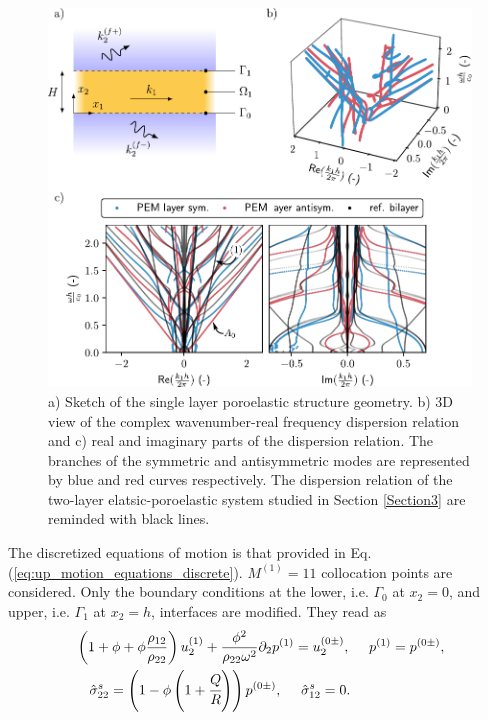 \begin{figure}
    \centering
    \includegraphics{chapitres/article_JAP/figures/poroelastic_appendix.pdf}
    \caption{a) Sketch of the single layer poroelastic structure geometry. b) 3D view of the complex wavenumber-real frequency dispersion relation and c) real and imaginary parts of the dispersion relation. The branches of the symmetric and antisymmetric modes are represented by blue and red curves respectively. The dispersion relation of the two-layer elatsic-poroelastic system studied in Section \ref{Section3} are reminded with black lines.}
    \label{fig:fluid_coupled_poroelastic}
\end{figure}
The discretized equations of motion is that provided in Eq.(\ref{eq:up_motion_equations_discrete}). $M^{(1)}=11$ collocation points are considered. Only the boundary conditions at the lower, i.e. $\Gamma_0$ at $x_2 = 0$, and upper, i.e. $\Gamma_1$ at $x_2 = h$, interfaces are modified. They read as \cite{debergue1999}
    \begin{equation}
        \begin{split}
            & \left(1 + \phi + \phi\frac{ \rho_{12}}{ \rho_{22}}\right)u_2^{(1)} + \frac{\phi^2}{ \rho_{22} \omega^2} \partial_2 p^{(1)} = u_2^{(0\pm)},~ 
            \quad p^{(1)}  = p^{(0\pm)},\\
            &\quad \hat \sigma_{22}^s = \left( 1 - \phi \left(1+ \cfrac{ Q} { R}\right)\right) p^{(0\pm)},~
            \quad \hat \sigma_{12}^s = 0.
        \end{split}
    \end{equation}
    
